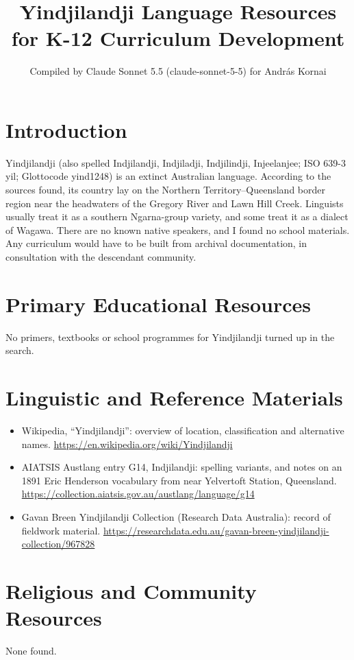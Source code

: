 \documentclass[12pt]{article}
\title{Yindjilandji Language Resources for K-12 Curriculum Development}
\author{Compiled by Claude Sonnet 5.5 (claude-sonnet-5-5) for Andr\'as Kornai}
\date{}
\begin{document}
\maketitle

\section{Introduction}
Yindjilandji (also spelled Indjilandji, Indjiladji, Indjilindji, Injeelanjee; ISO 639-3 yil; Glottocode yind1248) is an extinct Australian language. According to the sources found, its country lay on the Northern Territory--Queensland border region near the headwaters of the Gregory River and Lawn Hill Creek. Linguists usually treat it as a southern Ngarna-group variety, and some treat it as a dialect of Wagawa. There are no known native speakers, and I found no school materials. Any curriculum would have to be built from archival documentation, in consultation with the descendant community.

\section{Primary Educational Resources}
No primers, textbooks or school programmes for Yindjilandji turned up in the search.

\section{Linguistic and Reference Materials}
\begin{itemize}
\item Wikipedia, ``Yindjilandji'': overview of location, classification and alternative names. \url{https://en.wikipedia.org/wiki/Yindjilandji}
\item AIATSIS Austlang entry G14, Indjilandji: spelling variants, and notes on an 1891 Eric Henderson vocabulary from near Yelvertoft Station, Queensland. \url{https://collection.aiatsis.gov.au/austlang/language/g14}
\item Gavan Breen Yindjilandji Collection (Research Data Australia): record of fieldwork material. \url{https://researchdata.edu.au/gavan-breen-yindjilandji-collection/967828}
\end{itemize}

\section{Religious and Community Resources}
None found.
\end{document}
